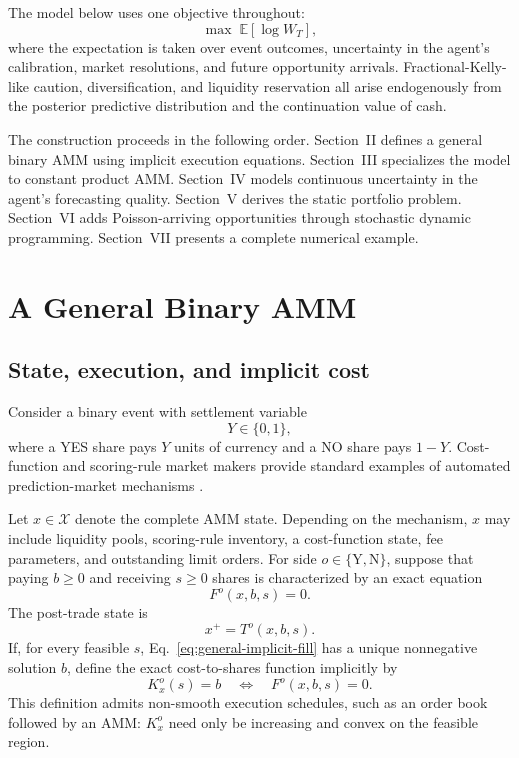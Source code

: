 \documentclass[journal, a4paper]{IEEEtran}
\begin{document}
The model below uses one objective throughout:
\begin{equation}
\max \; \mathbb{E}\!\left[\log W_T\right],
\label{eq:master-objective}
\end{equation}
where the expectation is taken over event outcomes, uncertainty in the agent's calibration, market resolutions, and future opportunity arrivals. Fractional-Kelly-like caution, diversification, and liquidity reservation all arise endogenously from the posterior predictive distribution and the continuation value of cash.

The construction proceeds in the following order. Section~II defines a general binary AMM using implicit execution equations. Section~III specializes the model to constant product AMM. Section~IV models continuous uncertainty in the agent's forecasting quality. Section~V derives the static portfolio problem. Section~VI adds Poisson-arriving opportunities through stochastic dynamic programming. Section~VII presents a complete numerical example.

\section{A General Binary AMM}
\subsection{State, execution, and implicit cost}
Consider a binary event with settlement variable
\begin{equation}
Y\in\{0,1\},
\end{equation}
where a YES share pays $Y$ units of currency and a NO share pays $1-Y$. Cost-function and scoring-rule market makers provide standard examples of automated prediction-market mechanisms \cite{hanson2007,chenpennock2007}.

Let $x\in\mathcal{X}$ denote the complete AMM state. Depending on the mechanism, $x$ may include liquidity pools, scoring-rule inventory, a cost-function state, fee parameters, and outstanding limit orders. For side $o\in\{\mathrm{Y},\mathrm{N}\}$, suppose that paying $b\geq 0$ and receiving $s\geq 0$ shares is characterized by an exact equation
\begin{equation}
F^{o}(x,b,s)=0.
\label{eq:general-implicit-fill}
\end{equation}
The post-trade state is
\begin{equation}
x^{+}=T^{o}(x,b,s).
\end{equation}
If, for every feasible $s$, Eq.~\eqref{eq:general-implicit-fill} has a unique nonnegative solution $b$, define the exact cost-to-shares function implicitly by
\begin{equation}
K^{o}_{x}(s)=b
\quad\Longleftrightarrow\quad
F^{o}(x,b,s)=0.
\label{eq:general-cost}
\end{equation}
This definition admits non-smooth execution schedules, such as an order book followed by an AMM:  $K_x^o$ need only be increasing and convex on the feasible region.
\end{document}
